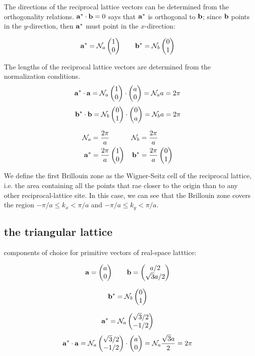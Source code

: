 \documentclass[10pt, a4paper, twocolumn]{article}
\begin{document}
The directions of the reciprocal lattice vectors  can be determined from the orthogonality relations. $\vb a^*\cdot \vb b=0$ says that $\vb a^*$ is orthogonal to $\vb b$; since $\vb b$ points in the $y$-direction, then $\vb a^*$ must point in the $x$-direction:

\[\vb a^*=\mathcal{N}_a\pmqty{1\\0}
\qquad \vb b^*=\mathcal{N}_b\pmqty{0\\1}\]

The lengths of the reciprocal lattice vectors are determined from the normalization conditions.
\[ \vb a^*\cdot\vb a =\mathcal{N}_a\pmqty{1\\0}
\cdot\pmqty{a\\0}=\mathcal{N}_aa=2\pi \]
\[ \vb b^*\cdot\vb b =\mathcal{N}_b\pmqty{0\\1}
\cdot\pmqty{0\\a}=\mathcal{N}_ba=2\pi \]

\begin{equation*}
\begin{aligned}
\mathcal N_a&=\frac{2\pi}{a}
& \mathcal N_b&=\frac{2\pi}{a}
\\ \vb a ^*&=\frac{2\pi}{a}\pmqty{1\\0}
& \vb b ^*&=\frac{2\pi}{a}\pmqty{0\\1}
\end{aligned}
\end{equation*}

We define the first Brillouin zone as the Wigner-Seitz cell of the reciprocal lattice, i.e. the area containing all the points that rae closer to the origin than to any other reciprocal-lattice site. In this case, we can see that the Brillouin zone covers the region $-\pi/a\leq k_x<\pi/a$ and $-\pi/a\leq k_y<\pi/a$.

\subsection{the triangular lattice}

components of choice for primitive vectors of real-space latttice:

\[\vb a =\pmqty{a\\0}\qquad\vb b=\pmqty{a/2\\\sqrt 3a/2}\]

\[ \vb b^*=\mathcal N_b\pmqty{0\\1} \]

\[\vb a^* = \mathcal N _a \pmqty{\sqrt 3/2\\-1/2} \]
\[\vb a^* \cdot \vb a =\mathcal N_a
\pmqty{\sqrt 3/2\\ -1/2} \cdot \pmqty{a\\0}
=\mathcal N_a \frac{\sqrt 3 a}{2} = 2\pi \]
\end{document}
